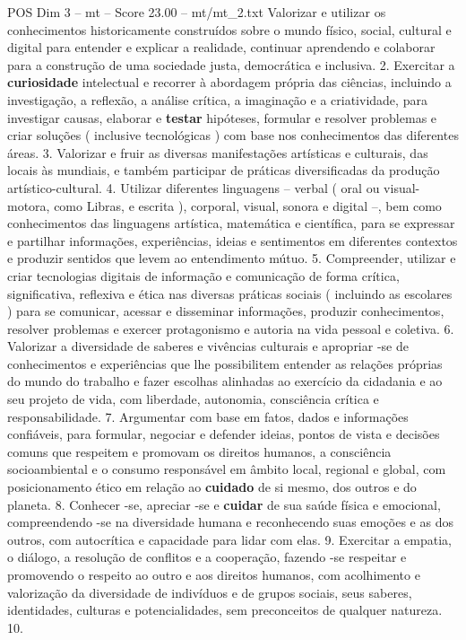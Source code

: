 \begin{textsample}{POS Dim 3 – mt – Score 23.00 – mt/mt\_2.txt}
Valorizar e utilizar os conhecimentos historicamente construídos sobre o mundo físico, social, cultural e digital para entender e explicar a realidade, continuar aprendendo e colaborar para a construção de uma sociedade justa, democrática e inclusiva. 2.
Exercitar a \textbf{curiosidade} intelectual e recorrer à abordagem própria das ciências, incluindo a investigação, a reflexão, a análise crítica, a imaginação e a criatividade, para investigar causas, elaborar e \textbf{testar} hipóteses, formular e resolver problemas e criar soluções ( inclusive tecnológicas ) com base nos conhecimentos das diferentes áreas. 3.
Valorizar e fruir as diversas manifestações artísticas e culturais, das locais às mundiais, e também participar de práticas diversificadas da produção artístico-cultural. 4.
Utilizar diferentes linguagens – verbal ( oral ou visual-motora, como Libras, e escrita ), corporal, visual, sonora e digital –, bem como conhecimentos das linguagens artística, matemática e científica, para se expressar e partilhar informações, experiências, ideias e sentimentos em diferentes contextos e produzir sentidos que levem ao entendimento mútuo. 5.
Compreender, utilizar e criar tecnologias digitais de informação e comunicação de forma crítica, significativa, reflexiva e ética nas diversas práticas sociais ( incluindo as escolares ) para se comunicar, acessar e disseminar informações, produzir conhecimentos, resolver problemas e exercer protagonismo e autoria na vida pessoal e coletiva. 6.
Valorizar a diversidade de saberes e vivências culturais e apropriar -se de conhecimentos e experiências que lhe possibilitem entender as relações próprias do mundo do trabalho e fazer escolhas alinhadas ao exercício da cidadania e ao seu projeto de vida, com liberdade, autonomia, consciência crítica e responsabilidade. 7.
Argumentar com base em fatos, dados e informações confiáveis, para formular, negociar e defender ideias, pontos de vista e decisões comuns que respeitem e promovam os direitos humanos, a consciência socioambiental e o consumo responsável em âmbito local, regional e global, com posicionamento ético em relação ao \textbf{cuidado} de si mesmo, dos outros e do planeta. 8.
Conhecer -se, apreciar -se e \textbf{cuidar} de sua saúde física e emocional, compreendendo -se na diversidade humana e reconhecendo suas emoções e as dos outros, com autocrítica e capacidade para lidar com elas. 9.
Exercitar a empatia, o diálogo, a resolução de conflitos e a cooperação, fazendo -se respeitar e promovendo o respeito ao outro e aos direitos humanos, com acolhimento e valorização da diversidade de indivíduos e de grupos sociais, seus saberes, identidades, culturas e potencialidades, sem preconceitos de qualquer natureza. 10.

\end{textsample}
